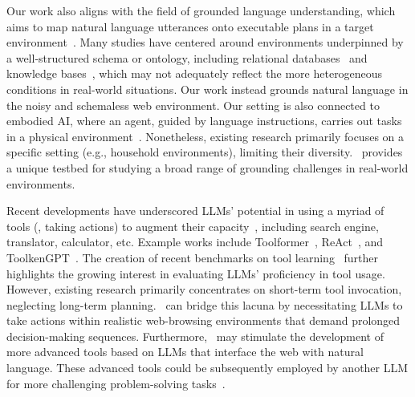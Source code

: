 \begin{remark} 
Our work also aligns with the field of grounded language understanding, which aims to map natural language utterances onto executable plans in a target environment~\cite{pangu}. 
Many studies have centered around environments underpinned by a well-structured schema or ontology, including relational databases~\cite{spider, wangRATSQLRelationAwareSchema2020} and knowledge bases~\cite{yihSemanticParsingStaged2015,gu2021beyond}, which may not adequately reflect the more heterogeneous conditions in real-world situations.
Our work instead grounds natural language in the noisy and schemaless web environment.
Our setting is also connected to embodied AI, where an agent, guided by language instructions, carries out tasks in a physical environment~\cite{alfred, SayCan, llm-planner}.
Nonetheless, existing research primarily focuses on a specific setting (e.g., household environments), limiting their diversity.
\mind\ provides a unique testbed for studying a broad range of grounding challenges in real-world environments.
\end{remark}


\begin{remark} 
Recent developments have underscored LLMs' potential in using a myriad of tools (\ie, taking actions) to augment their capacity~\cite{augmented, tool-survey}, including search engine, translator, calculator, etc.
Example works include Toolformer~\cite{toolformer}, ReAct~\cite{react}, and ToolkenGPT~\cite{toolkengpt}.
The creation of recent benchmarks on tool learning~\cite{api-bank, gorilla} further highlights the growing interest in evaluating LLMs' proficiency in tool usage.
However, existing research primarily concentrates on short-term tool invocation, neglecting long-term planning. 
\mind\ can bridge this lacuna by necessitating LLMs to take actions within realistic web-browsing environments that demand prolonged decision-making sequences. 
Furthermore, \mind\ may stimulate the development of more advanced tools based on LLMs that interface the web with natural language. 
These advanced tools could be subsequently employed by another LLM for more challenging problem-solving tasks~\cite{openagi, hugginggpt}.
\end{remark}